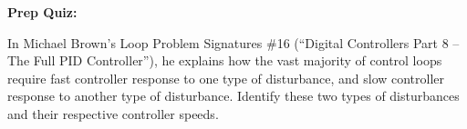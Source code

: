 \vfil \eject

\noindent
{\bf Prep Quiz:}

In Michael Brown's Loop Problem Signatures \#16 (``Digital Controllers Part 8 -- The Full PID Controller''), he explains how the vast majority of control loops require fast controller response to one type of disturbance, and slow controller response to another type of disturbance.  Identify these two types of disturbances and their respective controller speeds.




